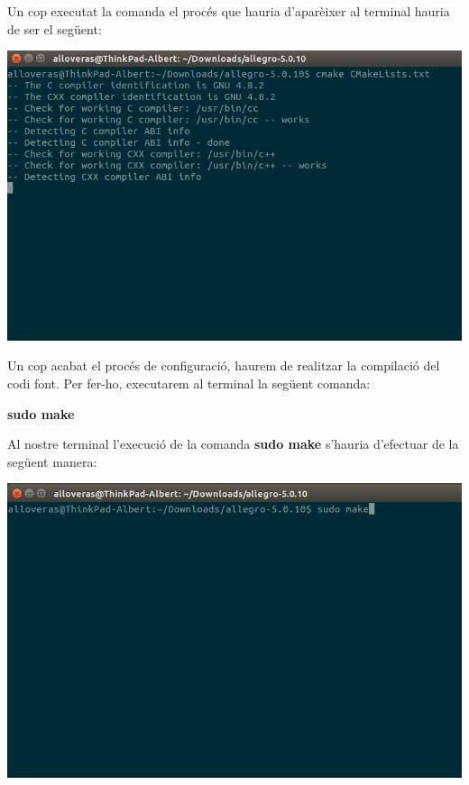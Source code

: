 \documentclass[11pt]{article}
\begin{document}
\noindent Un cop executat la comanda el procés que hauria d'aparèixer al terminal hauria de ser el següent:

\begin{center}
	\includegraphics[scale=0.4]{img/CMake_Execution.png}
\end{center}

\noindent Un cop acabat el procés de configuració, haurem de realitzar la compilació del codi font. Per fer-ho, executarem al terminal la següent comanda:

\begin{center}
	\textbf{sudo make}
\end{center}

\noindent Al nostre terminal l'execució de la comanda \textbf{sudo make} s'hauria d'efectuar de la següent manera:
\begin{center}
	\includegraphics[scale=0.4]{img/Make_Command.png}
\end{center}
\end{document}
